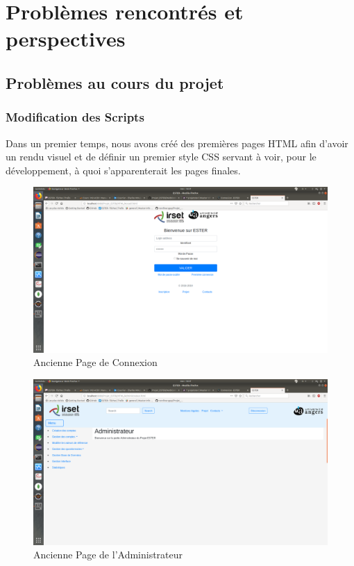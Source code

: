 \chapter{Problèmes rencontrés et perspectives}

\section{Problèmes au cours du projet}

\subsection{Modification des Scripts}

Dans un premier temps, nous avons créé des premières pages HTML afin d'avoir un rendu visuel et de définir un premier style CSS servant à voir, pour le développement, à quoi s'apparenterait les pages finales.

\begin{figure}[H]
    \begin{center}
	\includegraphics[scale=0.2,trim=4cm 0cm 4cm 5.3cm, clip=true]{img/OldConnexion}
    \end{center}
    \caption{Ancienne Page de Connexion}
\end{figure}

\begin{figure}[H]
    \begin{center}
	\includegraphics[scale=0.2,trim=2.8cm 0cm 0.8cm 5.3cm, clip=true]{img/OldAdmin}
    \end{center}
    \caption{Ancienne Page de l'Administrateur}
\end{figure}

